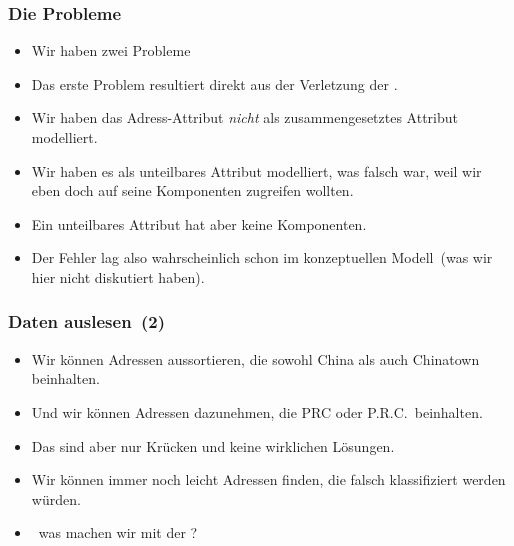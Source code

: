 \documentclass[aspectratio=169,mathserif,notheorems]{beamer}%
\begin{document}
%
\begin{frame}%
\frametitle{Die Probleme}%
\begin{itemize}%
%
\item Wir haben zwei Probleme%
%
\item<4-> Das erste Problem resultiert direkt aus der Verletzung der .%
%
\item<5-> Wir haben das Adress-Attribut \emph{nicht} als zusammengesetztes Attribut modelliert.%
%
\item<6-> Wir haben es als unteilbares Attribut modelliert, was falsch war, weil wir eben doch auf seine Komponenten zugreifen wollten.%
%
\item<7-> Ein unteilbares Attribut hat aber keine Komponenten.%
%
\item<8-> Der Fehler lag also wahrscheinlich schon im konzeptuellen Modell~(was wir hier nicht diskutiert haben).%
\end{itemize}%
\end{frame}%
%
%
\begin{frame}[t]%
\frametitle{Daten auslesen~(2)}%
\parbox{0.435\linewidth}{\small%
\begin{itemize}%
%
%
%
%
%
\item<3-> Wir können Adressen aussortieren, die sowohl China als auch Chinatown beinhalten.%
%
\item<4-> Und wir können Adressen dazunehmen, die PRC oder P.R.C.\ beinhalten.%
%
\item<5-> Das sind aber nur Krücken und keine wirklichen Lösungen.%
%
\item<6-> Wir können immer noch leicht Adressen finden, die falsch klassifiziert werden würden.%
%
\item<7-> \DEZB\ was machen wir mit der ?%
%
\end{itemize}%
}%
%
%
\end{frame}%
%
\end{document}
